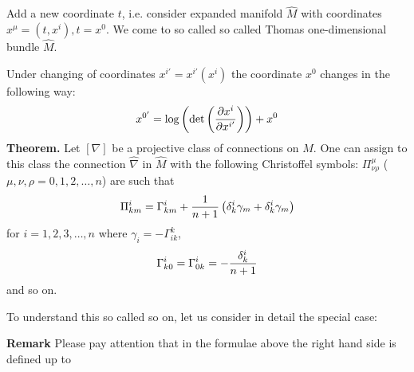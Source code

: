     Add a new coordinate $t$, i.e. consider expanded manifold $\hat M$ with coordinates
    $x^\mu=(t,x^i), t=x^0.$
     We come to so called  so called Thomas one-dimensional bundle $\hat M$.

     Under changing of coordinates
       $x^{i'}=x^{i'}(x^i)$ the coordinate $x^0$ changes in the following way:
                   $$
                x^{0'}=\log \left(\det\left({\partial x^i\over \partial x^{i'} }\right)\right)+x^0
                  $$
    {\bf Theorem.} Let $[\nabla]$ be a projective class of connections on $M$. One can assign to this class the connection
$\hat \nabla$ in $\hat M$ with the following Christoffel symbols:
  $\Pi^\mu_{\nu\rho}$  ($\mu,\nu,\rho=0,1,2,\dots,n$) are such that
                              $$
                       \Pi^i_{km}=\Gamma^i_{km}+{1\over n+1}\left(\delta^i_k\gamma_m+\delta^i_k\gamma_m \right)
                              $$
for $i=1,2,3,\dots,n$ where $\gamma_i=-\Gamma^k_{ik}$,
               $$
            \Gamma^i_{k0}=\Gamma^i_{0k}=-{\delta^i_k\over n+1}
               $$
and so on.

To understand this so called so on, let us consider in detail the special case:


{\bf Remark} Please pay attention that in the formulae above the right hand side is defined
up to





\bye


$$ $$



